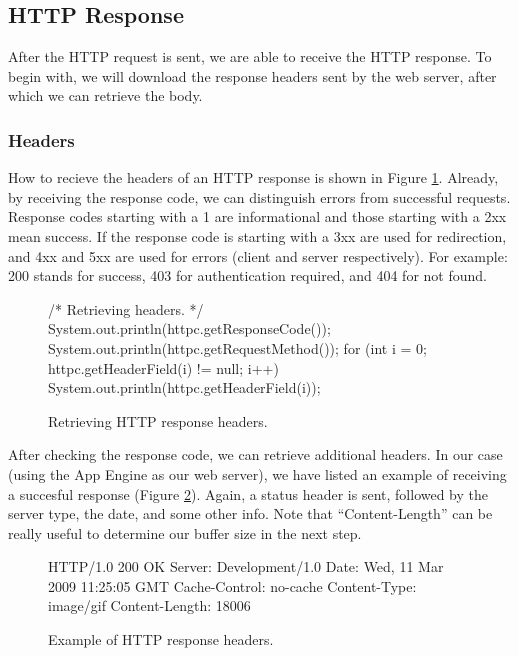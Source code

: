 \subsection{HTTP Response}
After the HTTP request is sent, we are able to receive the HTTP response. To
begin with, we will download the response headers sent by the web server, after
which we can retrieve the body.

\subsubsection{Headers}
How to recieve the headers of an HTTP response is shown in Figure
\ref{clientimpl-headers}. Already, by receiving the response code, we can
distinguish errors from successful requests. Response codes starting with a 1 are
informational and those starting with a 2xx mean success. If the response code
is starting with a 3xx are used for redirection, and 4xx and 5xx are used for
errors (client and server respectively). For example: 200 stands for success, 403 for
authentication required, and 404 for not found.

\begin{figure}[ht] %
\begin{center}
\begin{code}
/* Retrieving headers. */
System.out.println(httpc.getResponseCode());
System.out.println(httpc.getRequestMethod());
for (int i = 0; httpc.getHeaderField(i) != null; i++) {
    System.out.println(httpc.getHeaderField(i));
}
\end{code}
\caption{Retrieving HTTP response headers.\label{clientimpl-headers}}
\end{center}
\end{figure}

After checking the response code, we can retrieve additional headers. In our case
(using the App Engine as our web server), we have listed an example of receiving
a succesful response (Figure \ref{clientimpl-200}). Again, a status header is
sent, followed by the server type, the date, and some other info. Note that
``Content-Length'' can be really useful to determine our buffer size in the next
step.

\begin{figure}[ht] %
\begin{center}
\begin{code}
HTTP/1.0 200 OK
Server: Development/1.0
Date: Wed, 11 Mar 2009 11:25:05 GMT
Cache-Control: no-cache
Content-Type: image/gif
Content-Length: 18006
\end{code}
\caption{Example of HTTP response headers.\label{clientimpl-200}}
\end{center}
\end{figure}

